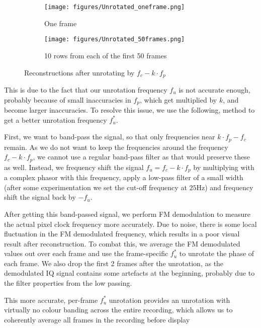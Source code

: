 \documentclass{article}
\begin{document}
\begin{figure}[htb]
\centering
\begin{subfigure}{.452696\textwidth}
    \centering
    \texttt{[image: figures/Unrotated\_oneframe.png]}
    \caption{One frame}
    \label{fig:unrotated_oneframe}
\end{subfigure}
\hfill
\begin{subfigure}{.475\textwidth}
    \centering
    \texttt{[image: figures/Unrotated\_50frames.png]}
    \caption{10 rows from each of the first 50 frames} 
    \label{fig:unrotated_50frames}
\end{subfigure}

\caption{Reconstructions after unrotating by $f_c - k \cdot f_p$}
\label{fig:unrotated}
\end{figure}

This is due to the fact that our unrotation frequency $f_u$ is not accurate enough, probably because of small inaccuracies in $f_p$, which get multiplied by $k$, and become larger inaccuracies. To resolve this issue, we use the following, method to get a better unrotation frequency $f_u^*$. 

First, we want to band-pass the signal, so that only frequencies near $k \cdot f_p - f_c$ remain. As we do not want to keep the frequencies around the frequency $f_c - k \cdot f_p$, we cannot use a regular band-pass filter as that would preserve these as well. Instead, we frequency shift the signal $f_u = f_c - k \cdot f_p$ by multiplying with a complex phasor with this frequency, apply a low-pass filter of a small width (after some experimentation we set the cut-off frequency at $25$Hz) and frequency shift the signal back by $-f_u$. 

After getting this band-passed signal, we perform FM demodulation to measure the actual pixel clock frequency more accurately. Due to noise, there is some local fluctuation in the FM demodulated frequency, which results in a poor visual result after reconstruction. To combat this, we average the FM demodulated values out over each frame and use the frame-specific $f_u^*$ to unrotate the phase of each frame. We also drop the first 2 frames after the unrotation, as the demodulated IQ signal contains some artefacts at the beginning, probably due to the filter properties from the low passing.

This more accurate, per-frame $f_u^*$ unrotation provides an unrotation with virtually no colour banding across the entire recording, which allows us to coherently average all frames in the recording before display
\end{document}
